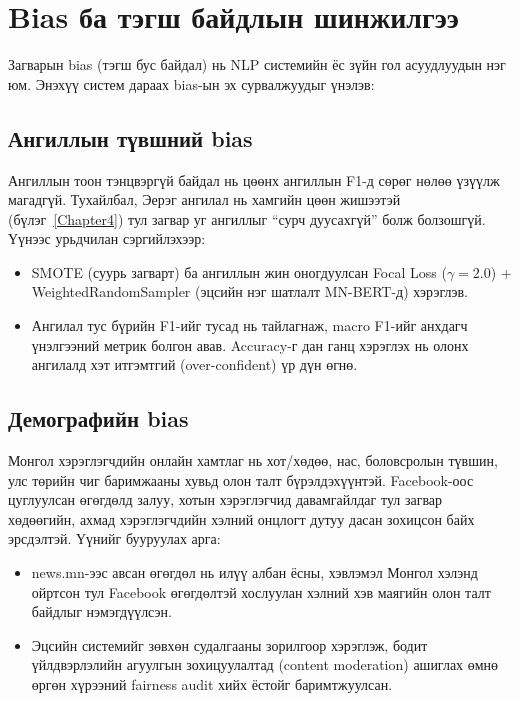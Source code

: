 \section{Bias ба тэгш байдлын шинжилгээ}

Загварын bias (тэгш бус байдал) нь NLP системийн ёс зүйн гол асуудлуудын нэг
юм. Энэхүү систем дараах bias-ын эх сурвалжуудыг үнэлэв:

\subsection{Ангиллын түвшний bias}

Ангиллын тоон тэнцвэргүй байдал нь цөөнх ангиллын F1-д сөрөг нөлөө үзүүлж
магадгүй. Тухайлбал, Эерэг ангилал нь хамгийн цөөн жишээтэй
(бүлэг~\ref{Chapter4}) тул загвар уг ангиллыг ``сурч дуусахгүй'' болж
болзошгүй. Үүнээс урьдчилан сэргийлэхээр:

\begin{itemize}
  \item SMOTE (суурь загварт) ба ангиллын жин оногдуулсан Focal Loss
    ($\gamma{=}2.0$) + WeightedRandomSampler (эцсийн нэг шатлалт MN-BERT-д) хэрэглэв.
  \item Ангилал тус бүрийн F1-ийг тусад нь тайлагнаж, macro F1-ийг анхдагч
    үнэлгээний метрик болгон авав. Accuracy-г дан ганц хэрэглэх нь олонх
    ангилалд хэт итгэмтгий (over-confident) үр дүн өгнө.
\end{itemize}

\subsection{Демографийн bias}

Монгол хэрэглэгчдийн онлайн хамтлаг нь хот/хөдөө, нас, боловсролын түвшин,
улс төрийн чиг баримжааны хувьд олон талт бүрэлдэхүүнтэй. Facebook-оос
цуглуулсан өгөгдөлд залуу, хотын хэрэглэгчид давамгайлдаг тул загвар
хөдөөгийн, ахмад хэрэглэгчдийн хэлний онцлогт дутуу дасан зохицсон байх
эрсдэлтэй. Үүнийг бууруулах арга:

\begin{itemize}
  \item news.mn-ээс авсан өгөгдөл нь илүү албан ёсны, хэвлэмэл Монгол
    хэлэнд ойртсон тул Facebook өгөгдөлтэй хослуулан хэлний хэв маягийн
    олон талт байдлыг нэмэгдүүлсэн.
  \item Эцсийн системийг зөвхөн судалгааны зорилгоор хэрэглэж, бодит
    үйлдвэрлэлийн агуулгын зохицуулалтад (content moderation) ашиглах
    өмнө өргөн хүрээний fairness audit хийх ёстойг баримтжуулсан.
\end{itemize}

